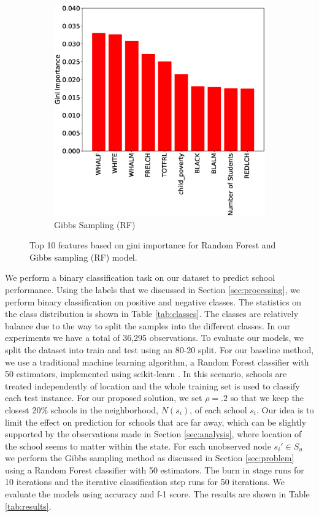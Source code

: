 \begin{figure}
\begin{subfigure}{.45\textwidth}
		\includegraphics[width=\linewidth]{images/features_gs}
		\caption{Gibbs Sampling (RF)}
	\end{subfigure}
	\caption{Top 10 features based on gini importance for Random Forest and Gibbs sampling (RF) model.}
	\label{fig:features}
\end{figure}

We perform a binary classification task on our dataset to predict school performance. Using the labels that we discussed in Section \ref{sec:processing}, we perform binary classification on positive and negative classes. The statistics on the class distribution is shown in Table \ref{tab:classes}. The classes are relatively balance due to the way to split the samples into the different classes. In our experiments we have a total of 36,295 observations. To evaluate our models, we split the dataset into train and test using an 80-20 split. For our baseline method, we use a traditional machine learning algorithm, a Random Forest classifier with 50 estimators, implemented using scikit-learn \cite{scikit-learn}. In this scenario, schools are treated independently of location and the whole training set is used to classify each test instance. For our proposed solution, we set $\rho = .2$ so that we keep the closest 20\% schools in the neighborhood, $N(s_i)$, of each school $s_i$. Our idea is to limit the effect on prediction for schools that are far away, which can be slightly supported by the observations made in Section \ref{sec:analysis}, where location of the school seems to matter within the state. For each unobserved node $s_i' \in S_u$ we perform the Gibbs sampling method as discussed in Section \ref{sec:problem} using a Random Forest classifier with 50 estimators. The burn in stage runs for 10 iterations and the iterative classification step runs for 50 iterations. We evaluate the models using accuracy and f-1 score. The results are shown in Table \ref{tab:results}.

